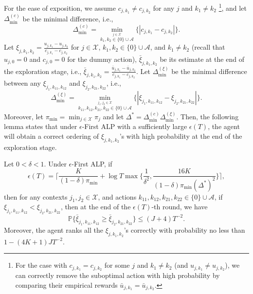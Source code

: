 For the ease of exposition, we assume $c_{j,k_1} \neq c_{j,k_2}$ for any $j$ and $k_1 \neq k_2$ \footnote{For the case with $c_{j,k_1} = c_{j,k_2}$ for some $j$ and $k_1 \neq k_2$ (and ${u}_{j,k_1} \neq {u}_{j,k_2}$), we can correctly remove the suboptimal action with high probability by comparing their empirical rewards $\bar{u}_{j,k_1} = \bar{u}_{j,k_2}$.}, and let $\Delta^{(c)}_{\min}$ be the minimal difference, i.e., 
\begin{equation}
\Delta^{(c)}_{\min} = \min_{\overset{j \in \mathcal{X}}{k_{1},k_{2} \in \{0\}\cup\mathcal{A}}} \{|c_{j,k_1} - c_{j,k_2}|\}.\nonumber
\end{equation}
Let $\xi_{j,k_1,k_2} = \frac{u_{j,k_1} - u_{j,k_2}}{c_{j,k_1} - c_{j,k_2}}$ for $j \in \mathcal{X}$, $k_1,k_2 \in \{0\}\cup\mathcal{A}$, and $k_1 \neq k_2$ (recall that $u_{j,0} = 0$ and $c_{j,0} = 0$ for the dummy action), $\bar{\xi}_{j,k_1,k_2}$ be its estimate at the end of the exploration stage, i.e.,  $\bar{\xi}_{j,k_1,k_2} = \frac{\bar{u}_{j,k_1} - \bar{u}_{j,k_2}}{c_{j,k_1} - c_{j,k_2}}$. Let $\Delta^{(\xi)}_{\min}$ be the minimal difference between any $\xi_{j_1, k_{11}, k_{12}}$ and $\xi_{j_2, k_{21}, k_{22}}$, i.e.,
\begin{equation}
\Delta^{(\xi)}_{\min} = \min_{\overset{j_1,j_2 \in \mathcal{X}}{ k_{11},k_{12},k_{21},k_{22} \in \{0\}\cup\mathcal{A}}} \{|\xi_{j_1, k_{11}, k_{12}} - \xi_{j_2, k_{21}, k_{22}}|\}.\nonumber
\end{equation}
Moreover, let $\pi_{\min} = \min_{j\in \mathcal{X}}\pi_j$ and let $\Delta^* = \Delta^{(c)}_{\min} \Delta^{(\xi)}_{\min}$.   Then, the following lemma states that under $\epsilon$-First ALP with a sufficiently large $\epsilon(T)$, the agent will obtain a correct ordering of $\xi_{j,k_1,k_2}$'s with high probability at the end of the exploration stage.
\begin{lemma}\label{thm:eps_first_estimate}
Let $0 < \delta < 1$. Under $\epsilon$-First ALP, if
\begin{equation}
\epsilon(T) = \bigg\lceil \frac{K}{(1-\delta)\pi_{\min}} + \log T \max\big\{\frac{1}{\delta^2}, \frac{16 K}{(1 - \delta)\pi_{\min}(\Delta^*)^2}\big\}\bigg\rceil, \nonumber
\end{equation}
then for any contexts $j_1,j_2 \in \mathcal{X}$, and actions $k_{11}, k_{12}, k_{21}, k_{22} \in \{0\}\cup\mathcal{A}$, if $\xi_{j_1,k_{11},k_{12}} < \xi_{j_2,k_{21},k_{22}}$, then at the end of the $\epsilon(T)$-th round, we have
\begin{equation}
\mathbb{P}\bigg\{\bar{\xi}_{j_1,k_{11},k_{12}} \geq \bar{\xi}_{j_2,k_{21},k_{22}} \bigg\} \leq (J + 4)T^{-2}.\nonumber
\end{equation}
Moreover, the agent ranks all the $\xi_{j,k_1,k_2}$'s correctly with probability no less than $1 - (4K + 1)JT^{-2}$.
\end{lemma}

